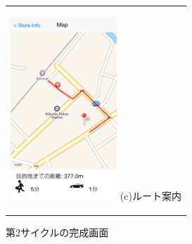 \begin{figure}[htbp]
\begin{center}
\begin{tabular}{c}
      \begin{minipage}{0.33\hsize}
        \begin{center}
\includegraphics[width=4cm, bb=0 0 320 548]{5.4_route.png}
          \hspace{1cm} %
          {\footnotesize (c)ルート案内}
        \end{center}
      \end{minipage}

    \end{tabular}
    \caption{第2サイクルの完成画面}
    \label{fig:lena}
  \end{center}
\end{figure}

